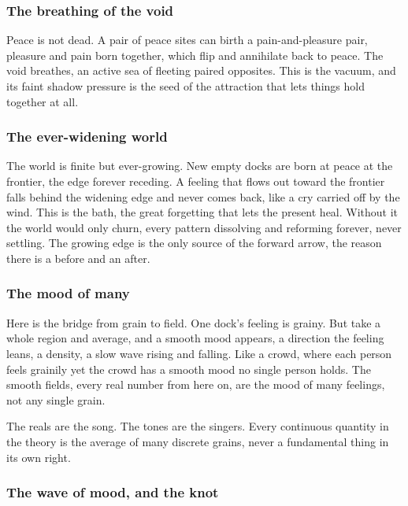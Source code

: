 \subsubsection{The breathing of the void}

Peace is not dead. A pair of peace sites can birth a pain-and-pleasure pair, pleasure and pain born together, which flip and annihilate back to peace. The void breathes, an active sea of fleeting paired opposites. This is the vacuum, and its faint shadow pressure is the seed of the attraction that lets things hold together at all.

\subsubsection{The ever-widening world}

The world is finite but ever-growing. New empty docks are born at peace at the frontier, the edge forever receding. A feeling that flows out toward the frontier falls behind the widening edge and never comes back, like a cry carried off by the wind. This is the bath, the great forgetting that lets the present heal. Without it the world would only churn, every pattern dissolving and reforming forever, never settling. The growing edge is the only source of the forward arrow, the reason there is a before and an after.

\subsubsection{The mood of many}

Here is the bridge from grain to field. One dock's feeling is grainy. But take a whole region and average, and a smooth mood appears, a direction the feeling leans, a density, a slow wave rising and falling. Like a crowd, where each person feels grainily yet the crowd has a smooth mood no single person holds. The smooth fields, every real number from here on, are the mood of many feelings, not any single grain.

\begin{result}
The reals are the song. The tones are the singers. Every continuous quantity in the theory is the average of many discrete grains, never a fundamental thing in its own right.
\end{result}

\subsubsection{The wave of mood, and the knot}

